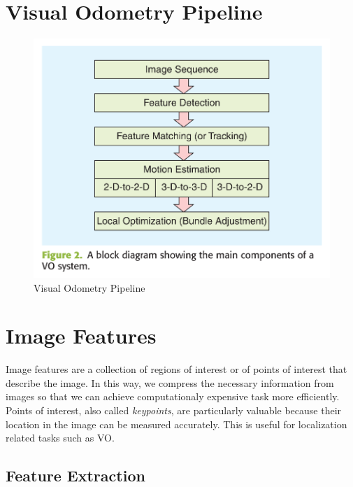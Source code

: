 \documentclass[a4paper]{report}
\numberwithin{figure}{section}
\begin{document}
\section{Visual Odometry Pipeline} \label{sc_visual_odometry_pipeline}

\begin{figure}[H]
	\centering
	\includegraphics[width=\linewidth,natwidth=640,natheight=640]
  {fig/ref_imgs/vo_pipeline.png}
  \caption{Visual Odometry Pipeline}
	\label{fig:visual_odometry_pipeline}
\end{figure}



\section{Image Features} \label{sc_img_features}

Image features are a collection of regions of interest or of points of interest 
that describe the image. In this way, we compress the necessary information 
from images so that we can achieve computationaly expensive task more efficiently.
Points of interest, also called \textit{keypoints}, 
are particularly valuable because their location in the image can be 
measured accurately. This is useful for localization related tasks such as VO. 

\subsection{Feature Extraction} \label{sb_sc_feature_extraction}
\end{document}
